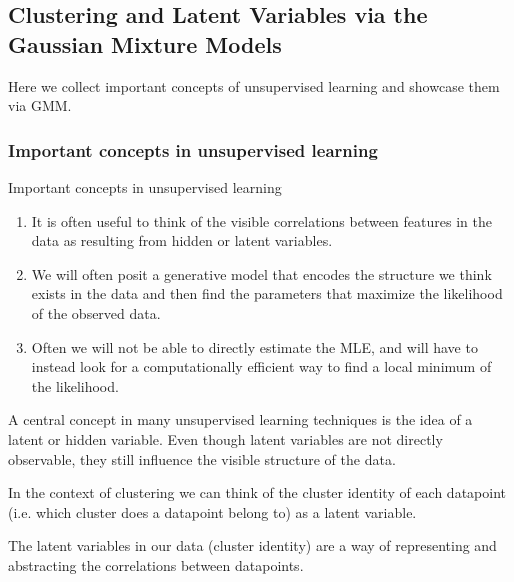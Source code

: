 \subsection{Clustering and Latent Variables via the Gaussian Mixture Models}
\label{subsec:clusterConcepts}
Here we collect important concepts of unsupervised learning and showcase them via GMM.
\subsubsection{Important concepts in unsupervised learning}
\label{subsubsec:clusterConceptsCollection}

\begin{mybox}{Important concepts in unsupervised learning}
	\label{subsubsec:clusterConceptsCollectionImportant}
\begin{enumerate}
\item It is often useful to think of the visible correlations between features in the data as resulting from hidden or latent variables.
\item We will often posit a generative model that encodes the structure we think exists in the data and then find the parameters that maximize the likelihood of the observed data.
\item Often we will not be able to directly estimate the MLE, and will have to instead look for a computationally efficient way to find a local minimum of the likelihood.
\end{enumerate}
\end{mybox}
A central concept in many unsupervised learning techniques is the idea of a latent or hidden variable. Even though latent variables are not directly observable, they still influence the visible structure of the data. 
\begin{example}
In the context of clustering we can think of the cluster identity of each datapoint (i.e. which cluster does a datapoint belong to) as a latent variable.
\end{example}
The latent variables in our data (cluster identity) are a way of representing and abstracting the correlations between datapoints.\\

